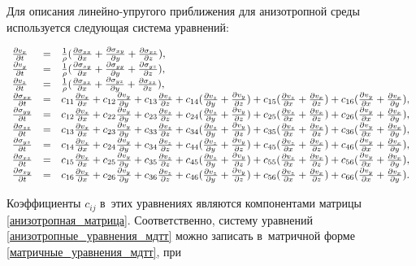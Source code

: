 \documentclass[thesis.tex]{subfiles}
\begin{document}
Для описания линейно-упругого приближения для анизотропной среды используется \cite{фаворская2011постановка} следующая
система уравнений:
\begin{small}
\begin{equation}
\label{анизотропные_уравнения_мдтт}
\begin{array}{lcl}
    \PDt{v_x} &=& \frac{1}{\rho}(\PDx \Sxx + \PDy \Sxy + \PDz \Sxz), \\
    \PDt{v_y} &=& \frac{1}{\rho}(\PDx \Sxy + \PDy \Syy + \PDz \Syz), \\
    \PDt{v_z} &=& \frac{1}{\rho}(\PDx \Sxz + \PDy \Syz + \PDz \Szz), \\

    \PDt \Sxx &=& c_{11}\PDx{v_x} + c_{12}\PDy{v_y} + c_{13}\PDz{v_z} +
                  c_{14}(\PDy{v_z} + \PDz{v_y}) +
                  c_{15}(\PDx{v_z} + \PDz{v_x}) +
                  c_{16}(\PDx{v_y} + \PDy{v_x}), \\
    \PDt \Syy &=& c_{12}\PDx{v_x} + c_{22}\PDy{v_y}+c_{23}\PDz{v_z} +
                  c_{24}(\PDy{v_z}+\PDz{v_y}) +
                  c_{25}(\PDx{v_z}+\PDz{v_x}) +
                  c_{26}(\PDx{v_y}+\PDy{v_x}), \\
    \PDt \Szz &=& c_{13}\PDx{v_x} + c_{23}\PDy{v_y} + c_{33}\PDz{v_z} +
                  c_{34}(\PDy{v_z} + \PDz{v_y}) +
                  c_{35}(\PDx{v_z} + \PDz{v_x}) +
                  c_{36}(\PDx{v_y} + \PDy{v_x}), \\
    \PDt \Syz &=& c_{14}\PDx{v_x} + c_{24}\PDy{v_y} + c_{34}\PDz{v_z} +
                  c_{44}(\PDy{v_z} + \PDz{v_y}) +
                  c_{45}(\PDx{v_z} + \PDz{v_x}) +
                  c_{46}(\PDx{v_y }+ \PDy{v_x}), \\
    \PDt \Sxz &=& c_{15}\PDx{v_x} + c_{25}\PDy{v_y} + c_{35}\PDz{v_z} +
                  c_{45}(\PDy{v_z} + \PDz{v_y}) +
                  c_{55}(\PDx{v_z} + \PDz{v_x}) +
                  c_{56}(\PDx{v_y} + \PDy{v_x}), \\
    \PDt \Sxy &=& c_{16}\PDx{v_x} + c_{26}\PDy{v_y} + c_{36}\PDz{v_z} +
                  c_{46}(\PDy{v_z} + \PDz{v_y}) +
                  c_{56}(\PDx{v_z} + \PDz{v_x}) +
                  c_{66}(\PDx{v_y} + \PDy{v_x}).
\end{array}
\end{equation}
\end{small}
Коэффициенты $c_{ij}$ в~этих уравнениях являются компонентами матрицы \eqref{анизотропная_матрица}. Соответственно,
систему уравнений \eqref{анизотропные_уравнения_мдтт} можно записать в~матричной форме \eqref{матричные_уравнения_мдтт}, при
\end{document}

